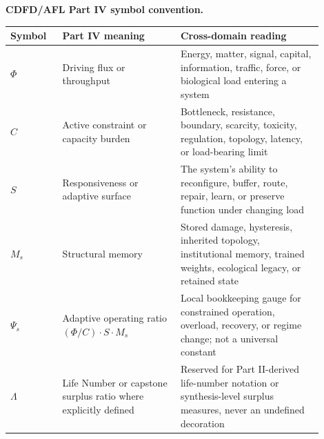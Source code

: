 \documentclass[11pt]{article}
\begin{document}
\noindent\textbf{CDFD/AFL Part IV symbol convention.}
\begin{center}
{\small
\begin{tabular}{p{0.15\linewidth}p{0.34\linewidth}p{0.41\linewidth}}
\hline
Symbol & Part IV meaning & Cross-domain reading \\
\hline
$\Phi$ & Driving flux or throughput & Energy, matter, signal, capital, information, traffic, force, or biological load entering a system \\
$C$ & Active constraint or capacity burden & Bottleneck, resistance, boundary, scarcity, toxicity, regulation, topology, latency, or load-bearing limit \\
$S$ & Responsiveness or adaptive surface & The system's ability to reconfigure, buffer, route, repair, learn, or preserve function under changing load \\
$M_s$ & Structural memory & Stored damage, hysteresis, inherited topology, institutional memory, trained weights, ecological legacy, or retained state \\
$\Psi_s$ & Adaptive operating ratio $(\Phi/C)\cdot S\cdot M_s$ & Local bookkeeping gauge for constrained operation, overload, recovery, or regime change; not a universal constant \\
$\Lambda$ & Life Number or capstone surplus ratio where explicitly defined & Reserved for Part II-derived life-number notation or synthesis-level surplus measures, never an undefined decoration \\
\hline
\end{tabular}
}
\end{center}
\end{document}
